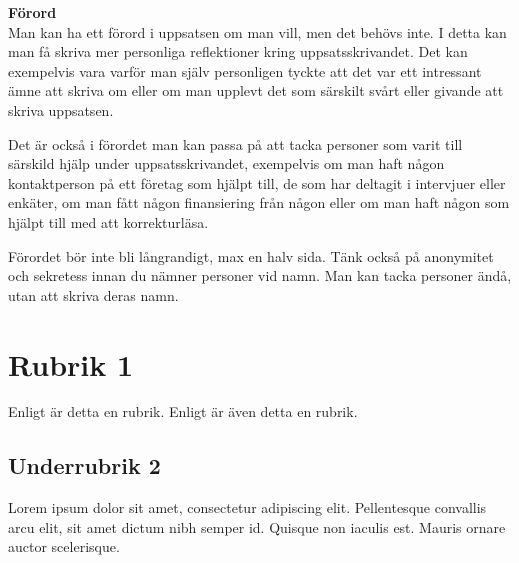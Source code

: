 \documentclass[a4paper,12pt]{article} %
\begin{document}
\newpage

\textbf {\large{Förord}}\\

\noindent Man kan ha ett förord i uppsatsen om man vill, men det behövs inte. I detta kan man få skriva mer personliga reflektioner kring uppsatsskrivandet. Det kan exempelvis vara varför man själv personligen tyckte att det var ett intressant ämne att skriva om eller om man upplevt det som särskilt svårt eller givande att skriva uppsatsen. 

Det är också i förordet man kan passa på att tacka personer som varit till särskild hjälp under uppsatsskrivandet, exempelvis om man haft någon kontaktperson på ett företag som hjälpt till, de som har deltagit i intervjuer eller enkäter, om man fått någon finansiering från någon eller om man haft någon som hjälpt till med att korrekturläsa. 

Förordet bör inte bli långrandigt, max en halv sida. Tänk också på anonymitet och sekretess innan du nämner personer vid namn. Man kan tacka personer ändå, utan att skriva deras namn. 

\newpage
{} %
\tableofcontents %
\newpage %



\section{Rubrik 1}
Enligt \cite{small} är detta en rubrik. Enligt \cite{big} är även detta en rubrik.
\subsection{Underrubrik 2}
Lorem ipsum dolor sit amet, consectetur adipiscing elit. Pellentesque convallis arcu elit, sit amet dictum nibh semper id. Quisque non iaculis est. Mauris ornare auctor scelerisque.
\end{document}
